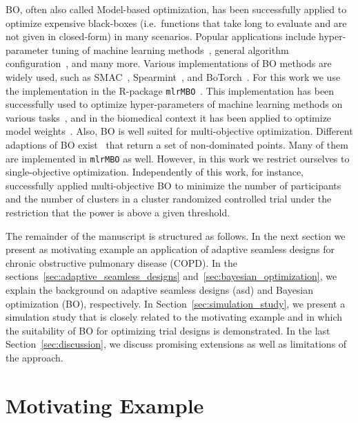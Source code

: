\documentclass[bimj,fleqn]{w-art}
\theoremstyle{plain}
\theoremstyle{definition}
\begin{document}
BO, often also called Model-based optimization, has been successfully applied to optimize expensive black-boxes (i.e.\ functions that take long to evaluate and are not given in closed-form) in many scenarios.
Popular applications include hyper-parameter tuning of machine learning methods~\citep{snoek_practical_2012}, general algorithm configuration~\citep{hutter_sequential_2011}, and many more.
Various implementations of BO methods are widely used, such as SMAC~\citep{hutter_sequential_2011}, Spearmint~\citep{snoek_practical_2012}, and BoTorch~\citep{balandat_botorch_2020}.
For this work we use the implementation in the R-package \texttt{mlrMBO}~\citep{bischl_mlrmbo_2017}.
This implementation has been successfully used to optimize hyper-parameters of machine learning methods on various tasks~\citep{bischl_mlrmbo_2017, wozniak_candle_2018}, and in the biomedical context it has been applied to optimize model weights~\citep{richter_modelbased_2019,browaeys_nichenet_2020}.
Also, BO is well suited for multi-objective optimization.
Different adaptions of BO exist~\citep{horn_modelbased_2015} that return a set of non-dominated points.
Many of them are implemented in \texttt{mlrMBO} as well.
However, in this work we restrict ourselves to single-objective optimization. 
Independently of this work, for instance, \citet{wilson_efficient_2021} successfully applied multi-objective BO to minimize the number of participants and the number of clusters in a cluster randomized controlled trial under the restriction that the power is above a given threshold.

The remainder of the manuscript is structured as follows.
In the next section we present as motivating example an application of adaptive seamless designs for chronic obstructive pulmonary disease (COPD).
In the sections~\ref{sec:adaptive_seamless_designs} and~\ref{sec:bayesian_optimization}, we explain the background on adaptive seamless designs (asd) and Bayesian optimization (BO), respectively.
In Section~\ref{sec:simulation_study}, we present a simulation study that is closely related to the motivating example and in which the suitability of BO for optimizing trial designs is demonstrated.
In the last Section~\ref{sec:discussion}, we discuss promising extensions as well as limitations of the approach.

\section{Motivating Example}
\label{sec:motivating_example}
\end{document}
